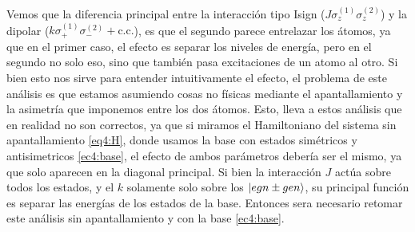 Vemos que la diferencia principal entre la interacción tipo Isign ($J\sigma_z^{(1)}\sigma_z^{(2)}$) y la dipolar ($k\sigma_+^{(1)}\sigma_-^{(2)}+\text{c.c.}$), es que el segundo parece entrelazar los átomos, ya que en el primer caso, el efecto es separar los niveles de energía, pero en el segundo no solo eso, sino que también pasa excitaciones de un atomo al otro. Si bien esto nos sirve para entender intuitivamente el efecto, el problema de este análisis es que estamos asumiendo cosas no físicas mediante el apantallamiento y la asimetría que imponemos entre los dos átomos. Esto, lleva a estos análisis que en realidad no son correctos, ya que si miramos el Hamiltoniano del sistema sin apantallamiento \ref{eq4:H}, donde usamos la base con estados simétricos y antisimetricos \ref{ec4:base}, el efecto de ambos parámetros debería ser el mismo, ya que solo aparecen en la diagonal principal. Si bien la interacción $J$ actúa sobre todos los estados, y el $k$ solamente solo sobre los $\ket{egn\pm gen}$, su principal función es separar las energías de los estados de la base.
Entonces sera necesario retomar este análisis sin apantallamiento y con la base \ref{ec4:base}.
